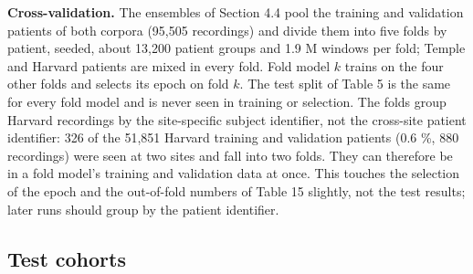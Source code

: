 \documentclass[11pt,a4paper]{article}
\begin{document}
\begin{table}[t]
\centering
\small
\caption{Splits of the training cohort \texttt{tuh\_heedb\_v1}. Recordings, patients, 10 s windows (millions) and mean age in years; report verdict as a percentage of the recordings.}
\end{table}


\textbf{Cross-validation.} The ensembles of Section 4.4 pool the training and validation patients of both corpora (95,505 recordings) and divide them into five folds by patient, seeded, about 13,200 patient groups and 1.9 M windows per fold; Temple and Harvard patients are mixed in every fold. Fold model $k$ trains on the four other folds and selects its epoch on fold $k$. The test split of Table 5 is the same for every fold model and is never seen in training or selection. The folds group Harvard recordings by the site-specific subject identifier, not the cross-site patient identifier: 326 of the 51,851 Harvard training and validation patients (0.6 \%, 880 recordings) were seen at two sites and fall into two folds. They can therefore be in a fold model's training and validation data at once. This touches the selection of the epoch and the out-of-fold numbers of Table 15 slightly, not the test results; later runs should group by the patient identifier.

\subsection{Test cohorts}
\end{document}
